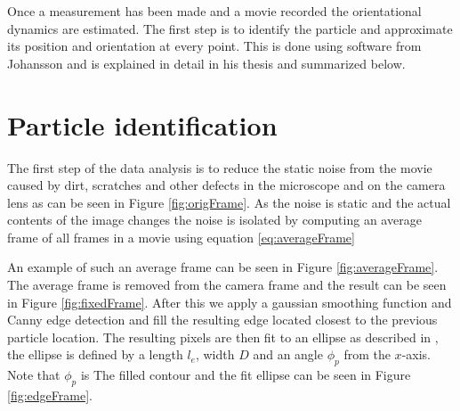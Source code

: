 \label{sec:dataanalysis}
Once a measurement has been made and a movie recorded the orientational dynamics are estimated. The first step is to identify the particle and approximate its position and orientation at every point. This is done using software from Johansson \cite{AntonThesis} and is explained in detail in his thesis and summarized below.

\section{Particle identification}\label{sec:particleidentification}

The first step of the data analysis is to reduce the static noise from the movie caused by dirt, scratches and other defects in the microscope and on the camera lens as can be seen in Figure \ref{fig:origFrame}. As the noise is static and the actual contents of the image changes the noise is isolated by computing an average frame of all frames in a movie using equation \ref{eq:averageFrame}

An example of such an average frame can be seen in Figure \ref{fig:averageFrame}. The average frame is removed from the camera frame and the result can be seen in Figure \ref{fig:fixedFrame}. After this we apply a gaussian smoothing function and Canny edge detection \cite{Canny} and fill the resulting edge located closest to the previous particle location. The resulting pixels are then fit to an ellipse as described in \cite{AntonThesis, EllipseFit}, the ellipse is defined by a length $l_e$, width $D$ and an angle $\phi_p$ from the $x$-axis. Note that $\phi_p$ is The filled contour and the fit ellipse can be seen in Figure 
\ref{fig:edgeFrame}.

